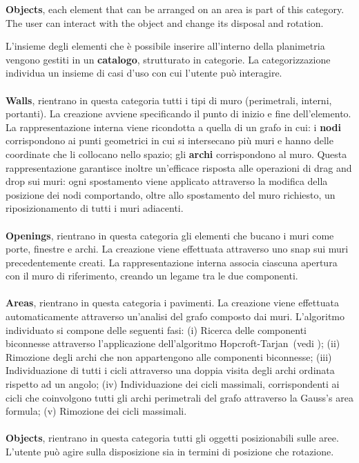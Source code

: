    \textbf{Objects}, each element that can be arranged on an area is part of this category. The user can interact with the object and change its disposal and rotation.

L'insieme degli elementi che \`e possibile inserire all'interno della planimetria vengono gestiti in un \textbf{catalogo}, strutturato in categorie.
La categorizzazione individua un insieme di casi d'uso con cui l'utente pu\`o interagire.\\\\
\textbf{Walls}, rientrano in questa categoria tutti i tipi di muro (perimetrali, interni, portanti). La creazione avviene specificando il punto di inizio e fine dell'elemento. La rappresentazione interna viene ricondotta a quella di un grafo in cui: i \textbf{nodi} corrispondono ai punti geometrici in cui si intersecano pi\`u muri e hanno delle coordinate che li collocano nello spazio; gli \textbf{archi} corrispondono al muro. Questa rappresentazione garantisce inoltre un’efficace risposta alle operazioni di drag and drop sui muri: ogni spostamento viene applicato attraverso la modifica della posizione dei nodi comportando, oltre allo spostamento del muro richiesto, un riposizionamento di tutti i muri adiacenti.\\\\
\textbf{Openings}, rientrano in questa categoria gli elementi che bucano i muri come porte, finestre e archi. La creazione viene effettuata attraverso uno snap sui muri precedentemente creati. La rappresentazione interna associa ciascuna apertura con il muro di riferimento, creando un legame tra le due componenti.\\\\
\textbf{Areas}, rientrano in questa categoria i pavimenti. La creazione viene effettuata automaticamente attraverso un'analisi del grafo composto dai muri. L'algoritmo individuato si compone delle seguenti fasi: (i) Ricerca delle componenti biconnesse attraverso l'applicazione dell'algoritmo Hopcroft-Tarjan~(vedi \cite{Hopcroft:1973:AEA:362248.362272}); 
(ii) Rimozione degli archi che non appartengono alle componenti biconnesse; 
(iii) Individuazione di tutti i cicli attraverso una doppia visita degli archi ordinata rispetto ad un angolo;
(iv) Individuazione dei cicli massimali, corrispondenti ai cicli che coinvolgono tutti gli archi perimetrali del grafo attraverso la Gauss's area formula;
(v) Rimozione dei cicli massimali.\\\\
\textbf{Objects}, rientrano in questa categoria tutti gli oggetti posizionabili sulle aree. L'utente pu\`o agire sulla disposizione sia in termini di posizione che rotazione.\\


